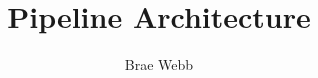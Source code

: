 \documentclass{csse4400}
\title{Pipeline Architecture}
\author{Brae Webb}
\date{\week{2}}
\begin{document}
\makecover





\end{document}
